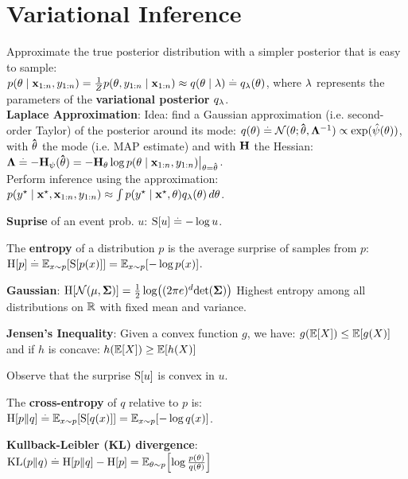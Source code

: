 \section{Variational Inference}
Approximate the true posterior distribution with a simpler posterior that is easy to sample: \\$p(\mathbf{\theta} \mid \mathbf{x}_{1:n}, y_{1:n}) = \frac{1}{Z} p(\mathbf{\theta}, y_{1:n} \mid \mathbf{x}_{1:n}) \approx q(\mathbf{\theta} \mid \mathbf{\lambda}) \overset{.}{=} q_{\mathbf{\lambda}}(\mathbf{\theta})$, where $\mathbf{\lambda}$ represents the parameters of the \textbf{variational posterior} $q_{\mathbf{\lambda}}$.\\
\textbf{Laplace Approximation}: Idea: find a Gaussian approximation (i.e. second-order Taylor) of the posterior around its mode:
$q(\vtheta) \defeq \N[\vtheta]{\vthetahat}{\inv{\mLambda}} \propto \exp(\hat{\psi}(\vtheta))$, with $\mathbf{\hat{\theta}}$ the mode (i.e. MAP estimate) and with $\mathbf{H}$ the Hessian: $\mathbf{\Lambda} \overset{.}{=} - \mathbf{H}_\psi(\mathbf{\hat{\theta}}) = - \mathbf{H}_{\mathbf{\theta}} \log p(\mathbf{\theta} \mid \mathbf{x}_{1:n}, y_{1:n}) \bigl|_{\mathbf{\theta} = \mathbf{\hat{\theta}}}$. \\
Perform inference using the approximation: $p(y^\star \mid \mathbf{x^\star}, \mathbf{x}_{1:n}, y_{1:n})  \approx \int p(y^\star \mid \mathbf{x^\star}, \mathbf{\theta}) q_{\mathbf{\lambda}}(\mathbf{\theta}) \,d\mathbf{\theta}$.
\begin{framed}
    \textbf{Suprise} of an event prob. $u$: $\S{u} \defeq - \log u$.
\end{framed}
\begin{framed}
    The \textbf{entropy} of a distribution $p$ is the average surprise of samples from $p$:\\
    $\H{p} \defeq \E[x \sim p]{\S{p(x)}} = \E[x \sim p]{- \log p(x)}$.
\end{framed}
\textbf{Gaussian}: $\H{\N{\vmu}{\mSigma}} = \frac{1}{2} \log \parentheses*{(2 \pi e)^d \det{\mSigma}}$
Highest entropy among all distributions on $\mathbb{R}$ with fixed mean and variance.
\begin{framed}
    \textbf{Jensen's Inequality}: Given a convex function $g$, we have:
    $g(\E{X}) \leq \E{g(X)}$ and if $h$ is concave:  $h(\E{X}) \geq \E{h(X)}$
\end{framed}
Observe that the surprise $\S{u}$ is convex in $u$.
\begin{framed}
    The \textbf{cross-entropy} of $q$ relative to $p$ is: \\
    $\crH{p}{q} \defeq \E[x \sim p]{\S{q(x)}} = \E[x \sim p]{- \log q(x)}$.
\end{framed}
\begin{framed}
    \textbf{Kullback-Leibler (KL) divergence}:
    $\KL{p}{q} \defeq \crH{p}{q} - \H{p} = \E[\vtheta \sim p]{\log \frac{p(\vtheta)}{q(\vtheta)}}$
\end{framed}
